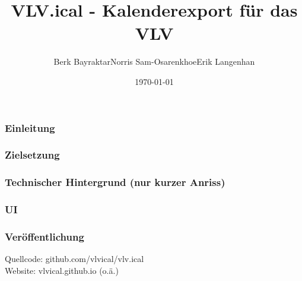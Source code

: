 \documentclass[10pt]{beamer}
\author{Berk Bayraktar\quad Norris Sam-Osarenkhoe\quad Erik Langenhan}
\title[VLV.ical]{VLV.ical - Kalenderexport für das VLV}
\date{\today}
\begin{document}
\frame{\titlepage}

\begin{frame}
    \frametitle{Einleitung}
\end{frame}

\begin{frame}
    \frametitle{Zielsetzung}
\end{frame}

\begin{frame}
    \frametitle{Technischer Hintergrund (nur kurzer Anriss)}
\end{frame}

\begin{frame}
    \frametitle{UI}
\end{frame}

\begin{frame}
    \frametitle{Veröffentlichung}
    Quellcode: github.com/vlvical/vlv.ical \\
    Website: vlvical.github.io (o.ä.)
\end{frame}
\end{document}
